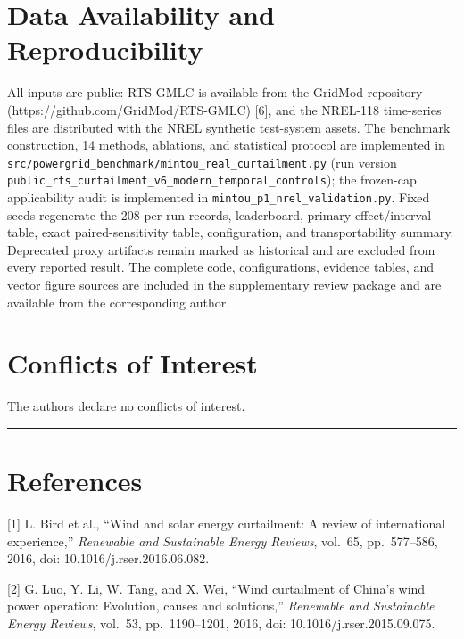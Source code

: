 \documentclass[
  10pt,
  a4paper,
]{article}
\begin{document}
\section{Data Availability and
Reproducibility}\label{data-availability-and-reproducibility}

All inputs are public: RTS-GMLC is available from the GridMod repository
(https://github.com/GridMod/RTS-GMLC) {[}6{]}, and the NREL-118
time-series files are distributed with the NREL synthetic test-system
assets. The benchmark construction, 14 methods, ablations, and
statistical protocol are implemented in
\texttt{src/powergrid\_benchmark/mintou\_real\_curtailment.py} (run
version
\texttt{public\_rts\_curtailment\_v6\_modern\_temporal\_controls}); the
frozen-cap applicability audit is implemented in
\texttt{mintou\_p1\_nrel\_validation.py}. Fixed seeds regenerate the 208
per-run records, leaderboard, primary effect/interval table, exact
paired-sensitivity table, configuration, and transportability summary.
Deprecated proxy artifacts remain marked as historical and are excluded
from every reported result. The complete code, configurations, evidence
tables, and vector figure sources are included in the supplementary
review package and are available from the corresponding author.

\section{Conflicts of Interest}\label{conflicts-of-interest}

The authors declare no conflicts of interest.

\begin{center}\rule{0.5\linewidth}{0.5pt}\end{center}

\section{References}\label{references}

{[}1{]} L. Bird et al., ``Wind and solar energy curtailment: A review of
international experience,'' \emph{Renewable and Sustainable Energy
Reviews}, vol.~65, pp.~577--586, 2016, doi: 10.1016/j.rser.2016.06.082.

{[}2{]} G. Luo, Y. Li, W. Tang, and X. Wei, ``Wind curtailment of
China's wind power operation: Evolution, causes and solutions,''
\emph{Renewable and Sustainable Energy Reviews}, vol.~53,
pp.~1190--1201, 2016, doi: 10.1016/j.rser.2015.09.075.
\end{document}
